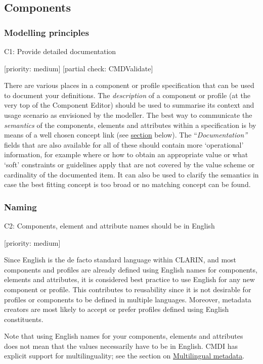 \documentclass[]{article}
\date{}
\begin{document}
\subsection{Components}\label{components}

\subsubsection{Modelling principles}\label{modelling-principles}

C1: Provide detailed documentation

{[}priority: medium{]} {[}partial check: CMDValidate{]}

There are various places in a component or profile specification that
can be used to document your definitions. The \emph{description} of a
component or profile (at the very top of the Component Editor) should be
used to summarise its context and usage scenario as envisioned by the
modeller. The best way to communicate the \emph{semantics} of the
components, elements and attributes within a specification is by means
of a well chosen concept link (see \protect\hyperlink{concepts}{section}
below). The ``\emph{Documentation''} fields that are also available for
all of these should contain more `operational' information, for example
where or how to obtain an appropriate value or what `soft' constraints
or guidelines apply that are not covered by the value scheme or
cardinality of the documented item. It can also be used to clarify the
semantics in case the best fitting concept is too broad or no matching
concept can be found.

\subsubsection{Naming}\label{naming}

C2: Components, element and attribute names should be in English

{[}priority: medium{]}

Since English is the de facto standard language within CLARIN, and most
components and profiles are already defined using English names for
components, elements and attributes, it is considered best practice to
use English for any new component or profile. This contributes to
reusability since it is not desirable for profiles or components to be
defined in multiple languages. Moreover, metadata creators are most
likely to accept or prefer profiles defined using English constituents.

Note that using English names for your components, elements and
attributes does not mean that the values necessarily have to be in
English. CMDI has explicit support for multilinguality; see the section
on
\href{../common_approachesproblems/multilingual_metadata.md}{Multilingual
metadata}.
\end{document}
